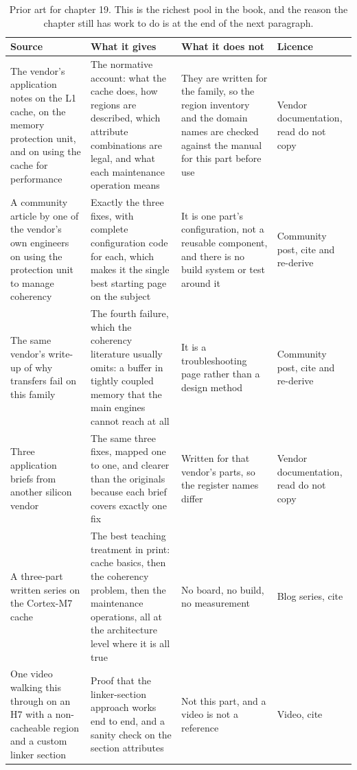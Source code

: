 \begin{table}[H]\centering\small
\begin{tabular}{p{34mm}p{46mm}p{38mm}p{20mm}}
\toprule
Source & What it gives & What it does not & Licence \\
\midrule
The vendor's application notes on the L1 cache, on the memory protection unit, and on using the cache for performance & The normative account: what the cache does, how regions are described, which attribute combinations are legal, and what each maintenance operation means & They are written for the family, so the region inventory and the domain names are checked against the manual for this part before use & Vendor documentation, read do not copy \\
A community article by one of the vendor's own engineers on using the protection unit to manage coherency & Exactly the three fixes, with complete configuration code for each, which makes it the single best starting page on the subject & It is one part's configuration, not a reusable component, and there is no build system or test around it & Community post, cite and re-derive \\
The same vendor's write-up of why transfers fail on this family & The fourth failure, which the coherency literature usually omits: a buffer in tightly coupled memory that the main engines cannot reach at all & It is a troubleshooting page rather than a design method & Community post, cite and re-derive \\
Three application briefs from another silicon vendor & The same three fixes, mapped one to one, and clearer than the originals because each brief covers exactly one fix & Written for that vendor's parts, so the register names differ & Vendor documentation, read do not copy \\
A three-part written series on the Cortex-M7 cache & The best teaching treatment in print: cache basics, then the coherency problem, then the maintenance operations, all at the architecture level where it is all true & No board, no build, no measurement & Blog series, cite \\
One video walking this through on an H7 with a non-cacheable region and a custom linker section & Proof that the linker-section approach works end to end, and a sanity check on the section attributes & Not this part, and a video is not a reference & Video, cite \\
\bottomrule
\end{tabular}
\caption{Prior art for chapter 19. This is the richest pool in the book, and the reason the chapter still has work to do is at the end of the next paragraph.}
\end{table}

